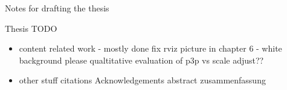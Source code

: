 \clearemptydoublepage

{}

\begin{center}
	\huge{Notes for drafting the thesis}
\end{center}


Thesis TODO
\begin{itemize}
\item content
\subitem related work - mostly done
\subitem fix rviz picture in chapter 6 - white background please
\subitem qualtitative evaluation of p3p vs scale adjust??
\item other stuff
\subitem citations
\subitem Acknowledgements
\subitem abstract
\subitem zusammenfassung
\end{itemize}
